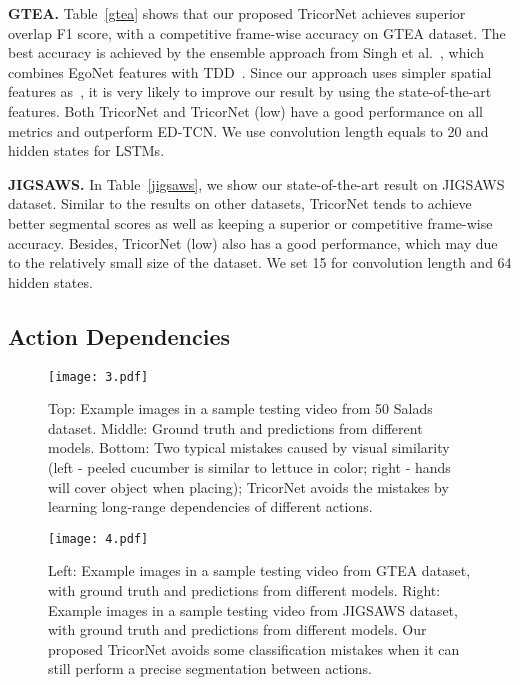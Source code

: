\documentclass{article}
\begin{document}
\noindent \textbf{GTEA.} \quad Table~\ref{gtea} shows that our proposed TricorNet achieves superior overlap F1 score, with a competitive frame-wise accuracy on GTEA dataset. The best accuracy is achieved by the ensemble approach from Singh et al.~\cite{ego}, which combines EgoNet features with TDD~\cite{tdd}. Since our approach uses simpler spatial features as~\cite{LeFlViCVPR2017}, it is very likely to improve our result by using the state-of-the-art features. Both TricorNet and TricorNet (low) have a good performance on all metrics and outperform ED-TCN. We use convolution length equals to 20 and  hidden states for LSTMs. 

\noindent \textbf{JIGSAWS.} \quad In Table~\ref{jigsaws}, we show our state-of-the-art result on JIGSAWS dataset. Similar to the results on other datasets, TricorNet tends to achieve better segmental scores as well as keeping a superior or competitive frame-wise accuracy. Besides, TricorNet (low) also has a good performance, which may due to the relatively small size of the dataset. We set 15 for convolution length and 64 hidden states.


\subsection{Action Dependencies}

\begin{figure}[t]
\centering
\texttt{[image: 3.pdf]}
\caption{Top: Example images in a sample testing video from 50 Salads dataset. Middle: Ground truth and predictions from different models. Bottom: Two typical mistakes caused by visual similarity (left - peeled cucumber is similar to lettuce in color; right - hands will cover object when placing); TricorNet avoids the mistakes by learning long-range dependencies of different actions.}
\label{f3}
\end{figure}

\begin{figure}[t]
\centering
\texttt{[image: 4.pdf]}
\caption{Left: Example images in a sample testing video from GTEA dataset, with ground truth and predictions from different models. Right: Example images in a sample testing video from JIGSAWS dataset, with ground truth and predictions from different models. Our proposed TricorNet avoids some classification mistakes when it can still perform a precise segmentation between actions.}
\label{f4}
\end{figure}
\end{document}
